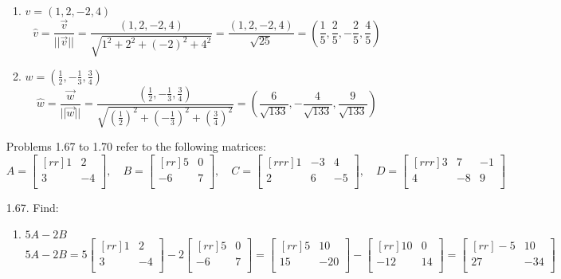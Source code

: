 \documentclass[12pt]{article}
\begin{document}
\begin{enumerate}
\begin{enumerate}
	\item $v=(1,2,-2,4)$\\
		\[ \hat{v} = \frac{\vec{v}}{||\vec{v}||} = \frac{(1,2,-2,4)}{\sqrt{1^2 + 2^2 + (-2)^2 + 4^2}} = \frac{(1,2,-2,4)}{\sqrt{25}} = (\frac{1}{5},\frac{2}{5},-\frac{2}{5},\frac{4}{5}) \]
		
	\item $w=(\frac{1}{2},-\frac{1}{3},\frac{3}{4})$\\
		\[ \hat{w} = \frac{\vec{w}}{||\vec{w}||} = \frac{(\frac{1}{2},-\frac{1}{3},\frac{3}{4})}{\sqrt{(\frac{1}{2})^2 + (-\frac{1}{3})^2 + (\frac{3}{4})^2}} =  (\frac{6}{\sqrt{133}},-\frac{4}{\sqrt{133}},\frac{9}{\sqrt{133}}) \]
	\end{enumerate}

\bigskip
Problems 1.67 to 1.70 refer to the following matrices:
\[ 	A= \begin{bmatrix}[rr] 1 & 2\\ 3 & -4\\ \end{bmatrix}, \quad
	B= \begin{bmatrix}[rr] 5 & 0\\ -6 & 7\\ \end{bmatrix}, \quad
	C= \begin{bmatrix}[rrr] 1 & -3 & 4\\ 2 & 6 & -5\\ \end{bmatrix}, \quad
	D= \begin{bmatrix}[rrr] 3 & 7 & -1\\ 4 & -8 & 9\\ \end{bmatrix} \]
\item[1.67.] Find:
	\begin{enumerate}
	\item $5A-2B$
		\[ 	5A-2B 
			= 5 \begin{bmatrix}[rr] 1 & 2\\ 3 & -4\\ \end{bmatrix}
			- 2 \begin{bmatrix}[rr] 5 & 0 \\ -6 & 7\\ \end{bmatrix}
			= \begin{bmatrix}[rr] 5 & 10\\ 15 & -20\\ \end{bmatrix}
			- \begin{bmatrix}[rr] 10 & 0\\ -12 & 14\\ \end{bmatrix}
			= \begin{bmatrix}[rr] -5 & 10\\ 27 & -34\\ \end{bmatrix} \]				
	

\end{enumerate}
\end{enumerate}
\end{document}

